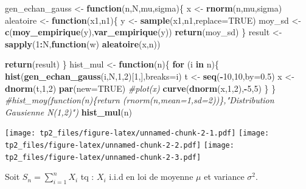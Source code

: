 \documentclass[]{article}
\newenvironment{Shaded}{\begin{snugshade}}{\end{snugshade}}
\newcommand{\CommentTok}[1]{\textcolor[rgb]{0.56,0.35,0.01}{\textit{#1}}}
\newcommand{\ControlFlowTok}[1]{\textcolor[rgb]{0.13,0.29,0.53}{\textbf{#1}}}
\newcommand{\DataTypeTok}[1]{\textcolor[rgb]{0.13,0.29,0.53}{#1}}
\newcommand{\DecValTok}[1]{\textcolor[rgb]{0.00,0.00,0.81}{#1}}
\newcommand{\FloatTok}[1]{\textcolor[rgb]{0.00,0.00,0.81}{#1}}
\newcommand{\KeywordTok}[1]{\textcolor[rgb]{0.13,0.29,0.53}{\textbf{#1}}}
\newcommand{\NormalTok}[1]{#1}
\newcommand{\OperatorTok}[1]{\textcolor[rgb]{0.81,0.36,0.00}{\textbf{#1}}}
\newcommand{\OtherTok}[1]{\textcolor[rgb]{0.56,0.35,0.01}{#1}}
\newcommand{\StringTok}[1]{\textcolor[rgb]{0.31,0.60,0.02}{#1}}
\begin{document}
\begin{Shaded}
\begin{Highlighting}[]
\NormalTok{gen_echan_gauss <-}\StringTok{ }\ControlFlowTok{function}\NormalTok{(n,N,mu,sigma)\{}
\NormalTok{    x <-}\StringTok{ }\KeywordTok{rnorm}\NormalTok{(n,mu,sigma)}
\NormalTok{    aleatoire <-}\StringTok{ }\ControlFlowTok{function}\NormalTok{(x1,n1)\{}
\NormalTok{      y <-}\StringTok{ }\KeywordTok{sample}\NormalTok{(x1,n1,}\DataTypeTok{replace=}\OtherTok{TRUE}\NormalTok{)}
\NormalTok{      moy_sd <-}\StringTok{ }\KeywordTok{c}\NormalTok{(}\KeywordTok{moy_empirique}\NormalTok{(y),}\KeywordTok{var_empirique}\NormalTok{(y))}
     \KeywordTok{return}\NormalTok{(moy_sd)}
\NormalTok{    \}}
\NormalTok{  result <-}\StringTok{ }\KeywordTok{sapply}\NormalTok{(}\DecValTok{1}\OperatorTok{:}\NormalTok{N,}\ControlFlowTok{function}\NormalTok{(w) }\KeywordTok{aleatoire}\NormalTok{(x,n))}
  
  \KeywordTok{return}\NormalTok{(result)}
\NormalTok{\}}
\NormalTok{hist_mul <-}\StringTok{ }\ControlFlowTok{function}\NormalTok{(n)\{}
  \ControlFlowTok{for}\NormalTok{ (i }\ControlFlowTok{in}\NormalTok{ n)\{}
    \KeywordTok{hist}\NormalTok{(}\KeywordTok{gen_echan_gauss}\NormalTok{(i,N,}\DecValTok{1}\NormalTok{,}\DecValTok{2}\NormalTok{)[}\DecValTok{1}\NormalTok{,],}\DataTypeTok{breaks=}\NormalTok{i)}
\NormalTok{    t <-}\StringTok{ }\KeywordTok{seq}\NormalTok{(}\OperatorTok{-}\DecValTok{10}\NormalTok{,}\DecValTok{10}\NormalTok{,}\DataTypeTok{by=}\FloatTok{0.5}\NormalTok{)}
\NormalTok{x <-}\StringTok{ }\KeywordTok{dnorm}\NormalTok{(t,}\DecValTok{1}\NormalTok{,}\DecValTok{2}\NormalTok{)}
\KeywordTok{par}\NormalTok{(}\DataTypeTok{new=}\OtherTok{TRUE}\NormalTok{)}
\CommentTok{#plot(x)}
\KeywordTok{curve}\NormalTok{(}\KeywordTok{dnorm}\NormalTok{(x,}\DecValTok{1}\NormalTok{,}\DecValTok{2}\NormalTok{),}\OperatorTok{-}\DecValTok{5}\NormalTok{,}\DecValTok{5}\NormalTok{)}
\NormalTok{  \}}
\NormalTok{\}}
\CommentTok{#hist_moy(function(n)\{return (rnorm(n,mean=1,sd=2))\},"Distribution Gausienne N(1,2)")}
\KeywordTok{hist_mul}\NormalTok{(n)}
\end{Highlighting}
\end{Shaded}

\texttt{[image: tp2\_files/figure-latex/unnamed-chunk-2-1.pdf]}
\texttt{[image: tp2\_files/figure-latex/unnamed-chunk-2-2.pdf]}
\texttt{[image: tp2\_files/figure-latex/unnamed-chunk-2-3.pdf]}

Soit \(S_{n}=\sum\limits_{i=1}^{n}X_{i}\) tq : \(X_{i}\) i.i.d en loi de
moyenne \(\mu\) et variance \(\sigma^{2}\).
\end{document}
